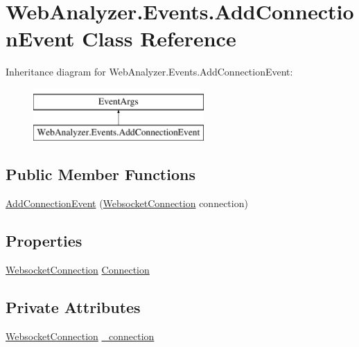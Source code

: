 \hypertarget{class_web_analyzer_1_1_events_1_1_add_connection_event}{}\section{Web\+Analyzer.\+Events.\+Add\+Connection\+Event Class Reference}
\label{class_web_analyzer_1_1_events_1_1_add_connection_event}
Inheritance diagram for Web\+Analyzer.\+Events.\+Add\+Connection\+Event\+:\begin{figure}[H]
\begin{center}
\leavevmode
\includegraphics[height=2.000000cm]{class_web_analyzer_1_1_events_1_1_add_connection_event}
\end{center}
\end{figure}
\subsection*{Public Member Functions}
\begin{DoxyCompactItemize}
\item 
\hyperlink{class_web_analyzer_1_1_events_1_1_add_connection_event_a647bfe795648d92f6139fb4d4e3f28fb}{Add\+Connection\+Event} (\hyperlink{class_web_analyzer_1_1_server_1_1_websocket_connection}{Websocket\+Connection} connection)
\end{DoxyCompactItemize}
\subsection*{Properties}
\begin{DoxyCompactItemize}
\item 
\hyperlink{class_web_analyzer_1_1_server_1_1_websocket_connection}{Websocket\+Connection} \hyperlink{class_web_analyzer_1_1_events_1_1_add_connection_event_a0ae15899a3e51b1831f5f310436de660}{Connection}
\end{DoxyCompactItemize}
\subsection*{Private Attributes}
\begin{DoxyCompactItemize}
\item 
\hyperlink{class_web_analyzer_1_1_server_1_1_websocket_connection}{Websocket\+Connection} \hyperlink{class_web_analyzer_1_1_events_1_1_add_connection_event_a986c0c4a2c512fa20048fddca4185a16}{\+\_\+connection}
\end{DoxyCompactItemize}


